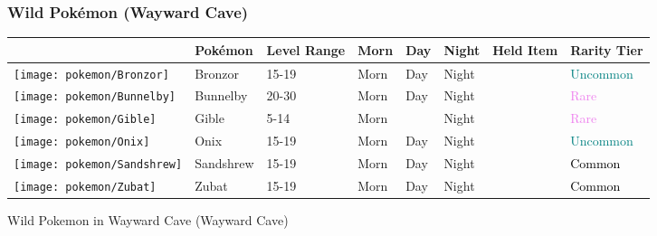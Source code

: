 \subsubsection{Wild Pokémon (Wayward Cave)}%
\label{ssubsec:WildPokmon(WaywardCave)}%
\begin{longtable}{||l l l l l l l l||}%
\hline%
&Pokémon&Level Range&Morn&Day&Night&Held Item&Rarity Tier\\%
\hline%
\endhead%
\hline%
\texttt{[image: pokemon/Bronzor]}&Bronzor&15{-}19&Morn&Day&Night&&\textcolor{teal}{%
Uncommon%
}\\%
\hline%
\texttt{[image: pokemon/Bunnelby]}&Bunnelby&20{-}30&Morn&Day&Night&&\textcolor{violet}{%
Rare%
}\\%
\hline%
\texttt{[image: pokemon/Gible]}&Gible&5{-}14&Morn&&Night&&\textcolor{violet}{%
Rare%
}\\%
\hline%
\texttt{[image: pokemon/Onix]}&Onix&15{-}19&Morn&Day&Night&&\textcolor{teal}{%
Uncommon%
}\\%
\hline%
\texttt{[image: pokemon/Sandshrew]}&Sandshrew&15{-}19&Morn&Day&Night&&\textcolor{black}{%
Common%
}\\%
\hline%
\texttt{[image: pokemon/Zubat]}&Zubat&15{-}19&Morn&Day&Night&&\textcolor{black}{%
Common%
}\\%
\hline%
\end{longtable}%
\caption{Wild Pokemon in Wayward Cave (Wayward Cave)}